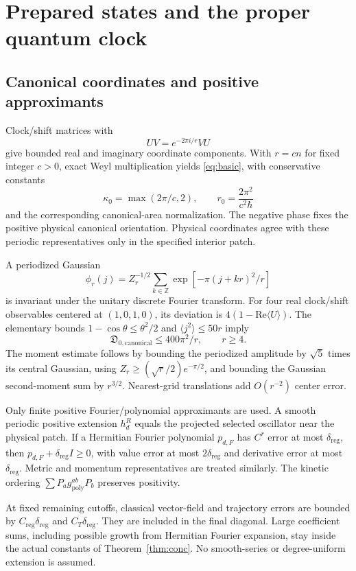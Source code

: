 \documentclass[11pt]{article}
\begin{document}
\section{Prepared states and the proper quantum clock}
\subsection{Canonical coordinates and positive approximants}
Clock/shift matrices with
\[
UV=e^{-2\pi i/r}VU
\]
give bounded real and imaginary coordinate components. With $r=cn$ for fixed integer $c>0$, exact Weyl multiplication yields \eqref{eq:basic}, with conservative constants
\[
\kappa_0=\max(2\pi/c,2),\qquad
r_0=\frac{2\pi^2}{c^2\hbar}
\]
and the corresponding canonical-area normalization. The negative phase fixes the positive physical canonical orientation. Physical coordinates agree with these periodic representatives only in the specified interior patch.

A periodized Gaussian
\[
\phi_r(j)=Z_r^{-1/2}\sum_{k\in\mathbb Z}
\exp[-\pi(j+kr)^2/r]
\]
is invariant under the unitary discrete Fourier transform. For four real clock/shift observables centered at $(1,0,1,0)$, its deviation is $4(1-\mathrm{Re}\langle U\rangle)$. The elementary bounds $1-\cos\theta\le\theta^2/2$ and $\langle j^2\rangle\le50r$ imply
\[
\mathfrak D_{0,\mathrm{canonical}}\le400\pi^2/r,\qquad r\ge4.
\]
The moment estimate follows by bounding the periodized amplitude by $\sqrt5$ times its central Gaussian, using $Z_r\ge(\sqrt r/2)e^{-\pi/2}$, and bounding the Gaussian second-moment sum by $r^{3/2}$. Nearest-grid translations add $O(r^{-2})$ center error.

Only finite positive Fourier/polynomial approximants are used. A smooth periodic positive extension $h_d^R$ equals the projected selected oscillator near the physical patch. If a Hermitian Fourier polynomial $p_{d,F}$ has $C^r$ error at most $\delta_{\mathrm{reg}}$, then $p_{d,F}+\delta_{\mathrm{reg}}I\ge0$, with value error at most $2\delta_{\mathrm{reg}}$ and derivative error at most $\delta_{\mathrm{reg}}$. Metric and momentum representatives are treated similarly. The kinetic ordering $\sum P_ag^{ab}_{\mathrm{poly}}P_b$ preserves positivity.

At fixed remaining cutoffs, classical vector-field and trajectory errors are bounded by $C_{\mathrm{reg}}\delta_{\mathrm{reg}}$ and $C_T\delta_{\mathrm{reg}}$. They are included in the final diagonal. Large coefficient sums, including possible growth from Hermitian Fourier expansion, stay inside the actual constants of Theorem~\ref{thm:conc}. No smooth-series or degree-uniform extension is assumed.
\end{document}
